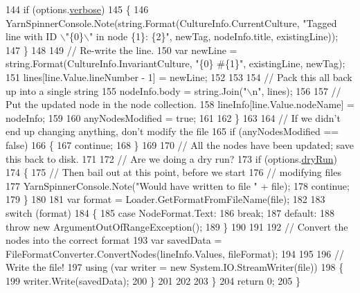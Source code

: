 \begin{DoxyCode}
144                     \textcolor{keywordflow}{if} (options.\hyperlink{a00040_ada4d83d1756918f362d55f6649b82b17}{verbose})
145                     \{
146                         YarnSpinnerConsole.Note(string.Format(CultureInfo.CurrentCulture, \textcolor{stringliteral}{"Tagged line with
       ID \(\backslash\)"\{0\}\(\backslash\)" in node \{1\}: \{2\}"}, newTag, nodeInfo.title, existingLine));
147                     \}
148 
149                     \textcolor{comment}{// Re-write the line.}
150                     var newLine = string.Format(CultureInfo.InvariantCulture, \textcolor{stringliteral}{"\{0\} #\{1\}"}, existingLine, 
      newTag);
151                     lines[line.Value.lineNumber - 1] = newLine;
152 
153 
154                     \textcolor{comment}{// Pack this all back up into a single string}
155                     nodeInfo.body = string.Join(\textcolor{stringliteral}{"\(\backslash\)n"}, lines);
156 
157                     \textcolor{comment}{// Put the updated node in the node collection.}
158                     lineInfo[line.Value.nodeName] = nodeInfo;
159 
160                     anyNodesModified = \textcolor{keyword}{true};
161 
162                 \}
163 
164                 \textcolor{comment}{// If we didn't end up changing anything, don't modify the file}
165                 \textcolor{keywordflow}{if} (anyNodesModified == \textcolor{keyword}{false})
166                 \{
167                     \textcolor{keywordflow}{continue};
168                 \}
169 
170                 \textcolor{comment}{// All the nodes have been updated; save this back to disk.}
171 
172                 \textcolor{comment}{// Are we doing a dry run?}
173                 \textcolor{keywordflow}{if} (options.\hyperlink{a00039_a5dc9d9db767738237e988f95fc0330f4}{dryRun})
174                 \{
175                     \textcolor{comment}{// Then bail out at this point, before we start}
176                     \textcolor{comment}{// modifying files}
177                     YarnSpinnerConsole.Note(\textcolor{stringliteral}{"Would have written to file "} + file);
178                     \textcolor{keywordflow}{continue};
179                 \}
180 
181                 var format = Loader.GetFormatFromFileName(file);
182 
183                 \textcolor{keywordflow}{switch} (format)
184                 \{
185                     \textcolor{keywordflow}{case} NodeFormat.Text:
186                         \textcolor{keywordflow}{break};
187                     \textcolor{keywordflow}{default}:
188                         \textcolor{keywordflow}{throw} \textcolor{keyword}{new} ArgumentOutOfRangeException();
189                 \}
190 
191 
192                 \textcolor{comment}{// Convert the nodes into the correct format}
193                 var savedData = FileFormatConverter.ConvertNodes(lineInfo.Values, fileFormat);
194 
195 
196                 \textcolor{comment}{// Write the file!}
197                 \textcolor{keyword}{using} (var writer = \textcolor{keyword}{new} System.IO.StreamWriter(file))
198                 \{
199                     writer.Write(savedData);
200                 \}
201 
202 
203             \}
204             \textcolor{keywordflow}{return} 0;
205         \}
\end{DoxyCode}


